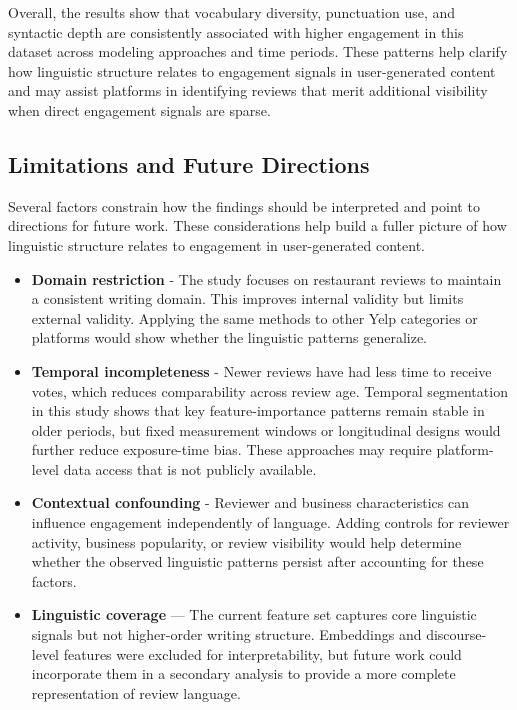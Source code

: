 \documentclass[12pt]{article}
\begin{document}
Overall, the results show that vocabulary diversity, punctuation use, and syntactic depth are consistently associated with higher engagement in this dataset across modeling approaches and time periods. These patterns help clarify how linguistic structure relates to engagement signals in user-generated content and may assist platforms in identifying reviews that merit additional visibility when direct engagement signals are sparse.


\subsection{Limitations and Future Directions}

Several factors constrain how the findings should be interpreted and point to directions for future work. These considerations help build a fuller picture of how linguistic structure relates to engagement in user-generated content.

\begin{itemize}

\item \textbf{Domain restriction} -  The study focuses on restaurant reviews to maintain a consistent writing domain. This improves internal validity but limits external validity. Applying the same methods to other Yelp categories or platforms would show whether the linguistic patterns generalize.

\item \textbf{Temporal incompleteness} - Newer reviews have had less time to receive votes, which reduces comparability across review age. Temporal segmentation in this study shows that key feature-importance patterns remain stable in older periods, but fixed measurement windows or longitudinal designs would further reduce exposure-time bias. These approaches may require platform-level data access that is not publicly available.

\item \textbf{Contextual confounding} -  Reviewer and business characteristics can influence engagement independently of language. Adding controls for reviewer activity, business popularity, or review visibility would help determine whether the observed linguistic patterns persist after accounting for these factors.

\item \textbf{Linguistic coverage} —  The current feature set captures core linguistic signals but not higher-order writing structure. Embeddings and discourse-level features were excluded for interpretability, but future work could incorporate them in a secondary analysis to provide a more complete representation of review language.

\end{itemize}
\end{document}
